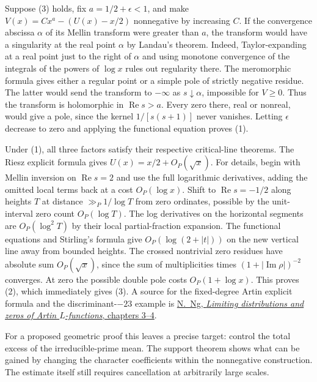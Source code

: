 Suppose (3) holds, fix $a=1/2+\epsilon<1$, and make $V(x)=Cx^a-(U(x)-x/2)$ nonnegative by increasing $C$. If the convergence abscissa $\alpha$ of its Mellin transform were greater than $a$, the transform would have a singularity at the real point $\alpha$ by Landau's theorem. Indeed, Taylor-expanding at a real point just to the right of $\alpha$ and using monotone convergence of the integrals of the powers of $\log x$ rules out regularity there. The meromorphic formula gives either a regular point or a simple pole of strictly negative residue. The latter would send the transform to $-\infty$ as $s\downarrow\alpha$, impossible for $V\ge0$. Thus the transform is holomorphic in $\operatorname{Re}s>a$. Every zero there, real or nonreal, would give a pole, since the kernel $1/[s(s+1)]$ never vanishes. Letting $\epsilon$ decrease to zero and applying the functional equation proves (1).

Under (1), all three factors satisfy their respective critical-line theorems. The Riesz explicit formula gives $U(x)=x/2+O_P(\sqrt{x})$. For details, begin with Mellin inversion on $\operatorname{Re}s=2$ and use the full logarithmic derivatives, adding the omitted local terms back at a cost $O_P(\log x)$. Shift to $\operatorname{Re}s=-1/2$ along heights $T$ at distance $\gg_P1/\log T$ from zero ordinates, possible by the unit-interval zero count $O_P(\log T)$. The log derivatives on the horizontal segments are $O_P(\log^2 T)$ by their local partial-fraction expansion. The functional equations and Stirling's formula give $O_P(\log(2+|t|))$ on the new vertical line away from bounded heights. The crossed nontrivial zero residues have absolute sum $O_P(\sqrt{x})$, since the sum of multiplicities times $(1+|\operatorname{Im}\rho|)^{-2}$ converges. At zero the possible double pole costs $O_P(1+\log x)$. This proves (2), which immediately gives (3). A source for the fixed-degree Artin explicit formula and the discriminant-$-23$ example is
\href{https://www.cs.uleth.ca/~nathanng/RESEARCH/phd.thesis.pdf}{N.~Ng, \emph{Limiting distributions and zeros of Artin $L$-functions}, chapters 3--4}.

For a proposed geometric proof this leaves a precise target: control the total excess of the irreducible-prime mean. The support theorem shows what can be gained by changing the character coefficients within the nonnegative construction. The estimate itself still requires cancellation at arbitrarily large scales.
